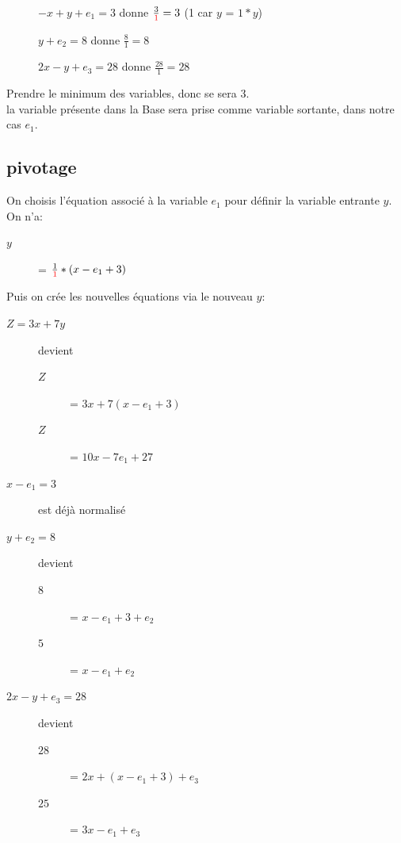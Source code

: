 \begin{description}
\item[] $ -x + y + e_1 = 3$ donne $\frac{3}{\textcolor{red}{1}} = 3$ (1 car $y$ = $1*y$)
\item[] $ y + e_2 = 8$ donne $\frac{8}{1} = 8$
\item[] $ 2x - y + e_3 = 28$ donne $\frac{28}{1} = 28$
\end{description}
Prendre le minimum des variables, donc se sera $3$.\\
la variable présente dans la Base sera prise comme variable sortante, dans notre cas $e_1$.\\
\pagebreak
\subsection{pivotage}
On choisis l'équation associé à la variable $e_1$ pour définir la variable entrante $y$.\\
On n'a:
\begin{description}
\item[$y$] = $\frac{1}{\textcolor{red}{1}}*(x - e_1 + 3)$
\end{description}

Puis on crée les nouvelles équations via le nouveau $y$:
\begin{description}
\item[$Z = 3x + 7y$] devient
\begin{description}
\item[$Z$] = $3x + 7(x - e_1 + 3)$
\item[$Z$] = $10x - 7e_1 + 27$
\end{description}
\item[$x - e_1 = 3$] est déjà normalisé
\item[$y + e_2 = 8$] devient
\begin{description}
\item[$8$] = $x -e_1 + 3 + e_2$
\item[$5$] = $x - e_1 + e_2$
\end{description}
\item[$2x - y + e_3 = 28$] devient
\begin{description}
\item[$28$] = $2x + (x - e_1 + 3) + e_3$
\item[$25$] = $3x - e_1 + e_3$
\end{description}
\end{description}
